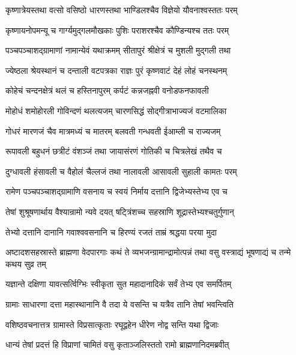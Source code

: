 \twolineshloka
{कृष्णात्रेयस्तथा वत्सो वसिष्ठो धारणस्तथा}
{भाण्डिलश्चैव विज्ञेयो यौवनाश्वस्ततः परम्}%

\twolineshloka
{कृष्णायनोपमन्यू च गार्ग्यमुद्गलमौखकाः}
{पुशिः पराशरश्चैव कौण्डिन्यश्च ततः परम्}%

\twolineshloka
{पञ्चपञ्चाशद्ग्रामाणां नामान्येवं यथाक्रमम्}
{सीतापुरं श्रीक्षेत्रं च मुशली मुद्गली तथा}%

\twolineshloka
{ज्येष्ठला श्रेयस्थानं च दन्ताली वटपत्रका}
{राज्ञः पुरं कृष्णवाटं देहं लोहं चनस्थनम्}%

\twolineshloka
{कोहेचं चन्दनक्षेत्रं थलं च हस्तिनापुरम्}
{कर्पटं कन्नजह्नवी वनोडफनफावली}%

\twolineshloka
{मोहोधं शमोहोरली गोविन्दणं थलत्यजम्}
{चारणसिद्धं सोद्गीत्राभाज्यजं वटमालिका}%

\twolineshloka
{गोधरं मारणजं चैव मात्रमध्यं च मातरम्}
{बलवती गन्धवती ईआम्ली च राज्यजम्}%

\twolineshloka
{रूपावली बहुधनं छत्रीटं वंशञ्जं तथा}
{जायासंरणं गोतिकी च चित्रलेखं तथैव च}%

\twolineshloka
{दुग्धावली हंसावली च वैहोलं चैल्लजं तथा}
{नालावली आसावली सुहाली कामतः परम्}%

\twolineshloka
{रामेण पञ्चपञ्चाशद्ग्रामाणि वसनाय च}
{स्वयं निर्माय दत्तानि द्विजेभ्यस्तेभ्य एव च}%

\twolineshloka
{तेषां शुश्रूषणार्थाय वैश्यान्रामो न्यवे दयत्}
{षट्त्रिंशच्च सहस्राणि शूद्रास्तेभ्यश्चतुर्गुणान्}%

\twolineshloka
{तेभ्यो दत्तानि दानानि गवाश्ववसनानि च}
{हिरण्यं रजतं ताम्रं श्रद्धया परया मुदा}%


\threelineshloka
{अष्टादशसहस्रास्ते ब्राह्मणा वेदपारगाः}
{कथं ते व्यभजन्ग्रामान्द्रामोत्पन्नं तथा वसु}
{वस्त्राद्यं भूषणाद्यं च तन्मे कथय सुव्र तम्}%


\twolineshloka
{यज्ञान्ते दक्षिणा यावत्सर्त्विग्भिः स्वीकृता सुत}
{महादानादिकं सर्वं तेभ्य एव समर्पितम्}%

\twolineshloka
{ग्रामाः साधारणा दत्ता महास्थानानि वै तदा}
{ये वसन्ति च यत्रैव तानि तेषां भवन्त्विति}%

\twolineshloka
{वशिष्ठवचनात्तत्र ग्रामास्ते विप्रसात्कृताः}
{रघूद्वहेन धीरेण नोद्व सन्ति यथा द्विजाः}%

\twolineshloka
{धान्यं तेषां प्रदत्तं हि विप्राणां चामितं वसु}
{कृताञ्जलिस्ततो रामो ब्राह्मणानिदमब्रवीत्}%

